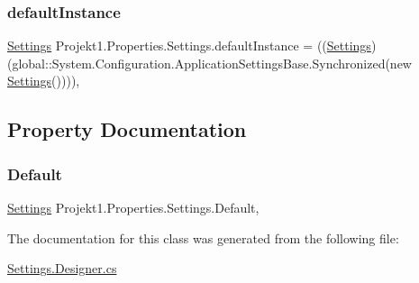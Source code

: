 \subsubsection{\texorpdfstring{defaultInstance}{defaultInstance}}
{\footnotesize\ttfamily \mbox{\hyperlink{class_projekt1_1_1_properties_1_1_settings}{Settings}} Projekt1.\+Properties.\+Settings.\+default\+Instance = ((\mbox{\hyperlink{class_projekt1_1_1_properties_1_1_settings}{Settings}})(global\+::\+System.\+Configuration.\+Application\+Settings\+Base.\+Synchronized(new \mbox{\hyperlink{class_projekt1_1_1_properties_1_1_settings}{Settings}}())))\hspace{0.3cm}{\ttfamily [static]}, {\ttfamily [private]}}



\subsection{Property Documentation}
\mbox{\label{class_projekt1_1_1_properties_1_1_settings_ad594e027ca2ba59c742fbd851a1ba331}} 
\subsubsection{\texorpdfstring{Default}{Default}}
{\footnotesize\ttfamily \mbox{\hyperlink{class_projekt1_1_1_properties_1_1_settings}{Settings}} Projekt1.\+Properties.\+Settings.\+Default\hspace{0.3cm}{\ttfamily [static]}, {\ttfamily [get]}}



The documentation for this class was generated from the following file\+:\begin{DoxyCompactItemize}
\item 
\mbox{\hyperlink{_settings_8_designer_8cs}{Settings.\+Designer.\+cs}}\end{DoxyCompactItemize}
